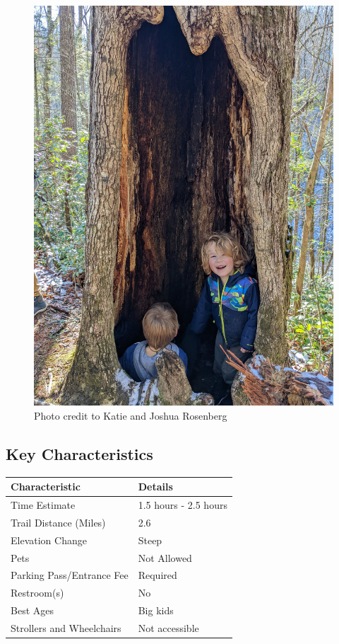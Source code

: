 \documentclass[
  letterpaper,
  DIV=11,
  numbers=noendperiod]{scrreprt}
\begin{document}
\begin{figure}[H]

{\centering \includegraphics[width=6.25in,height=\textheight,keepaspectratio]{img/trail-27-figure-01.jpg}

}

\caption{Photo credit to Katie and Joshua Rosenberg}

\end{figure}%

\subsection{Key Characteristics}\label{key-characteristics-27}

\begin{longtable}[]{@{}ll@{}}
\toprule\noalign{}
\textbf{Characteristic} & \textbf{Details} \\
\midrule\noalign{}
\endhead
\bottomrule\noalign{}
\endlastfoot
Time Estimate & 1.5 hours - 2.5 hours \\
Trail Distance (Miles) & 2.6 \\
Elevation Change & Steep \\
Pets & Not Allowed \\
Parking Pass/Entrance Fee & Required \\
Restroom(s) & No \\
Best Ages & Big kids \\
Strollers and Wheelchairs & Not accessible \\
\end{longtable}
\end{document}
